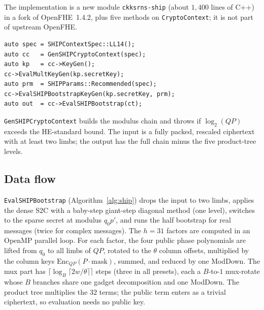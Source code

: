 \documentclass[sigconf,nonacm]{acmart}
\begin{document}
The implementation is a new module \texttt{ckksrns-ship} (about $1{,}400$ lines of C++) in a fork of OpenFHE~1.4.2, plus five methods on \texttt{CryptoContext}; it is not part of upstream OpenFHE.
\begin{verbatim}
auto spec = SHIPContextSpec::LL14();
auto cc   = GenSHIPCryptoContext(spec);
auto kp   = cc->KeyGen();
cc->EvalMultKeyGen(kp.secretKey);
auto prm  = SHIPParams::Recommended(spec);
cc->EvalSHIPBootstrapKeyGen(kp.secretKey, prm);
auto out  = cc->EvalSHIPBootstrap(ct);
\end{verbatim}
\texttt{GenSHIPCryptoContext} builds the modulus chain and throws if $\log_2(QP)$ exceeds the HE-standard bound.
The input is a fully packed, rescaled ciphertext with at least two limbs; the output has the full chain minus the five product-tree levels.

\subsection{Data flow}
\texttt{EvalSHIPBootstrap} (Algorithm~\ref{alg:ship}) drops the input to two limbs, applies the dense S2C with a baby-step giant-step diagonal method (one level), switches to the sparse secret at modulus $q_0p'$, and runs the half bootstrap for real messages (twice for complex messages).
The $h=31$ factors are computed in an OpenMP parallel loop.
For each factor, the four public phase polynomials are lifted from $q_0$ to all limbs of $QP$, rotated to the $\theta$ column offsets, multiplied by the column keys $\mathrm{Enc}_{QP}(P\cdot\text{mask})$, summed, and reduced by one ModDown.
The mux part has $\lceil\log_B\lceil 2w/\theta\rceil\rceil$ steps (three in all presets), each a $B$-to-$1$ mux-rotate whose $B$ branches share one gadget decomposition and one ModDown.
The product tree multiplies the $32$ terms; the public term enters as a trivial ciphertext, so evaluation needs no public key.
\end{document}

